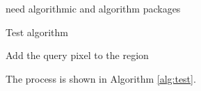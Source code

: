 \documentclass[10pt]{article}
\begin{document}


need algorithmic and algorithm packages
\begin{algorithm}
\caption{Test algorithm}
\label{alg:test}
\begin{algorithmic}
\STATE Add the query pixel to the region
\ENDIF
\end{algorithmic}
\end{algorithm}

The process is shown in Algorithm \ref{alg:test}.
\end{document}
